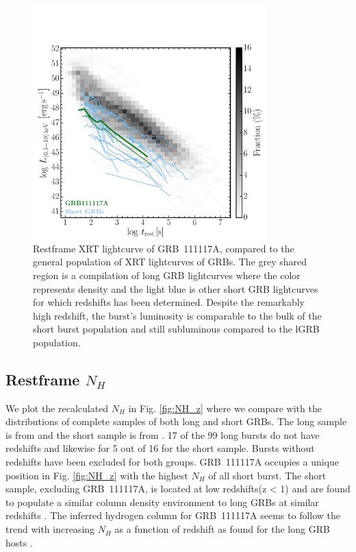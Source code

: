 \documentclass{aa}    %
\begin{document}
\begin{figure}
	\centering
	\includegraphics[width=9cm]{figures/XLC_111117A_rest.pdf}
	\caption{Restframe XRT lightcurve of GRB~111117A, compared to the general population of XRT lightcurves of GRBs. The grey shared region is a compilation of long GRB lightcurves where the color represents density and the light blue is other short GRB lightcurves for which redshifts has been determined. Despite the remarkably high redshift, the burst’s luminosity is comparable to the bulk of the short burst population and still subluminous compared to the lGRB population.}
	\label{fig:sxray_lightcurve}
\end{figure}


\subsection{Restframe $N_H$}

We plot the recalculated $N_H$ in Fig. \ref{fig:NH_z} where we compare with the
distributions of complete samples of both long and short GRBs. The long sample
is from \citet{Arcodia2016} and the short sample is from \citet{DAvanzo2014a}.
17 of the 99 long bursts do not have redshifts and likewise for 5 out of 16 for
the short sample. Bursts without redshifts have been excluded for both groups.
GRB~111117A occupies a unique position in Fig. \ref{fig:NH_z} with the highest
$N_H$ of all short burst. The short sample, excluding GRB~111117A, is located at
low redshifts(z < 1) and are found to populate a similar column density
environment to long GRBs at similar redshifts \citep{DAvanzo2014a}. The inferred
hydrogen column for GRB~111117A seems to follow the trend with increasing $N_H$
as a function of redshift as found for the long GRB hosts \citep{Arcodia2016}.
\end{document}
